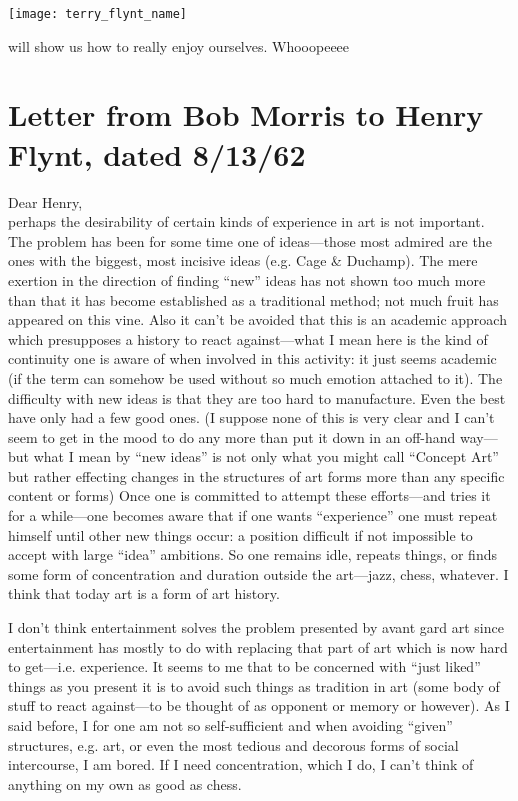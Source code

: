 {\centering \texttt{[image: terry\_flynt\_name]} \par}

will show us how to really enjoy ourselves. Whooopeeee 
\vfill
{}

\clearpage

\section*{{\normalsize Letter from Bob Morris to Henry Flynt, dated 8/13/62}}

\vfill 
\noindent
Dear Henry, \\
perhaps the desirability of certain kinds of experience in art is not 
important. The problem has been for some time one of ideas---those most 
admired are the ones with the biggest, most incisive ideas (e.g. Cage \& 
Duchamp). The mere exertion in the direction of finding \enquote{new} ideas has 
not shown too much more than that it has become established as a 
traditional method; not much fruit has appeared on this vine. Also it can't be 
avoided that this is an academic approach which presupposes a history to 
react against---what I mean here is the kind of continuity one is aware of 
when involved in this activity: it just seems academic (if the term can 
somehow be used without so much emotion attached to it). The difficulty 
with new ideas is that they are too hard to manufacture. Even the best have 
only had a few good ones. (I suppose none of this is very clear and I can't 
seem to get in the mood to do any more than put it down in an off-hand 
way---but what I mean by \enquote{new ideas} is not only what you might call
\enquote{Concept Art} but rather effecting changes in the structures of art forms 
more than any specific content or forms) Once one is committed to attempt 
these efforts---and tries it for a while---one becomes aware that if one wants 
\enquote{experience} one must repeat himself until other new things occur: a 
position difficult if not impossible to accept with large \enquote{idea} ambitions. So 
one remains idle, repeats things, or finds some form of concentration and 
duration outside the art---jazz, chess, whatever. I think that today art is a 
form of art history. 

I don't think entertainment solves the problem presented by avant gard art 
since entertainment has mostly to do with replacing that part of art which is 
now hard to get---i.e. experience. It seems to me that to be concerned with 
\enquote{just liked} things as you present it is to avoid such things as tradition in art 
(some body of stuff to react against---to be thought of as opponent or 
memory or however). As I said before, I for one am not so self-sufficient and 
when avoiding \enquote{given} structures, e.g. art, or even the most tedious and 
decorous forms of social intercourse, I am bored. If I need concentration, 
which I do, I can't think of anything on my own as good as chess. 

